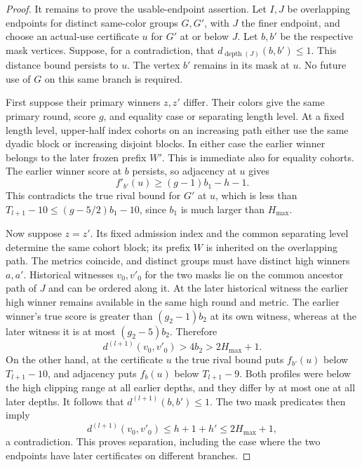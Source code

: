 \begin{proof}
It remains to prove the usable-endpoint assertion.  Let $I,J$ be
overlapping endpoints for distinct same-color groups $G,G'$, with $J$
the finer endpoint, and choose an actual-use certificate $u$ for
$G'$ at or below $J$.  Let $b,b'$ be the respective mask vertices.  Suppose,
for a contradiction, that $d_{\operatorname{depth}(J)}(b,b')\le1$.
This distance bound persists to $u$.  The vertex $b'$ remains in its mask at $u$.
No future use of $G$ on this same branch is required.

First suppose their primary winners $z,z'$ differ.  Their colors give
the same primary round, score $g$, and equality case or separating
length level.  At a fixed length level, upper-half index cohorts on an
increasing path either use the same dyadic block or increasing disjoint
blocks.  In either case the earlier winner belongs to the later frozen
prefix $W'$.  This is immediate also for equality cohorts.  The earlier
winner score at $b$ persists, so adjacency at $u$ gives
\[
 f'_{b'}(u)\ge(g-1)b_1-h-1.
\]
This contradicts the true rival bound for $G'$ at $u$, which is less
than $T_{l+1}-10\le(g-5/2)b_1-10$, since $b_1$ is much larger than
$H_{\max}$.

Now suppose $z=z'$.  Its fixed admission index and the common
separating level determine the same cohort block; its prefix $W$ is inherited on the
overlapping path.  The metrics coincide, and distinct groups must have distinct high
winners $a,a'$.  Historical witnesses $v_0,v'_0$ for the two masks lie
on the common ancestor path of $J$ and can be ordered along it.  At the
later historical witness the earlier high winner remains available in
the same high round and metric.  The earlier winner's true score is
greater than $(g_2-1)b_2$ at its own witness, whereas at the later
witness it is at most $(g_2-5)b_2$.  Therefore
\[
 d^{(l+1)}(v_0,v'_0)>4b_2>2H_{\max}+1.
\]
On the other hand, at the certificate $u$ the true rival bound puts
$f_{b'}(u)$ below $T_{l+1}-10$, and adjacency puts $f_b(u)$ below
$T_{l+1}-9$.  Both profiles were below the high clipping range at all
earlier depths, and they differ by at most one at all later depths.
It follows that $d^{(l+1)}(b,b')\le1$.  The two mask predicates then
imply
\[
 d^{(l+1)}(v_0,v'_0)\le h+1+h'\le2H_{\max}+1,
\]
a contradiction.  This proves separation, including the case where the
two endpoints have later certificates on different branches.
\end{proof}

